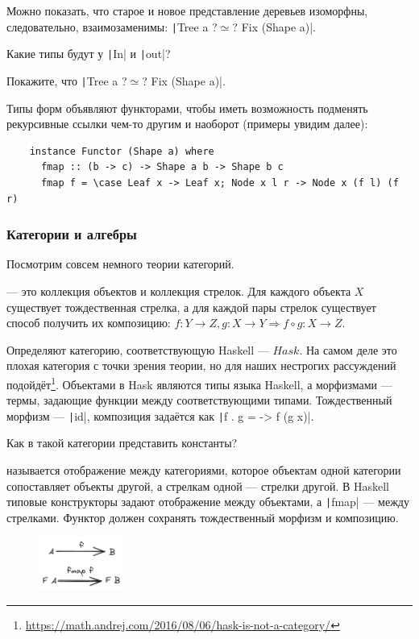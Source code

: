 Можно показать, что старое и новое представление деревьев изоморфны, следовательно, взаимозаменимы: \texttt|Tree a ?$\simeq$? Fix (Shape a)|.

\begin{task}
    Какие типы будут у \texttt|In| и \texttt|out|?
\end{task}

\begin{task}
    Покажите, что \texttt|Tree a ?$\simeq$? Fix (Shape a)|.
\end{task}

Типы форм объявляют функторами, чтобы иметь возможность подменять рекурсивные ссылки чем-то другим и наоборот (примеры увидим далее):
\begin{verbatim}
    instance Functor (Shape a) where
      fmap :: (b -> c) -> Shape a b -> Shape b c
      fmap f = \case Leaf x -> Leaf x; Node x l r -> Node x (f l) (f r)
\end{verbatim}

\subsubsection{Категории и алгебры}

Посмотрим совсем немного теории категорий.

 --- это коллекция объектов и коллекция стрелок.
Для каждого объекта $X$ существует тождественная стрелка, а для каждой пары стрелок существует способ получить их композицию: $f : Y \to Z, g : X \to Y \Rightarrow f \circ g : X \to Z$.

Определяют категорию, соответствующую Haskell --- $Hask$.
На самом деле это плохая категория с точки зрения теории, но для наших нестрогих рассуждений подойдёт\footnote{\url{https://math.andrej.com/2016/08/06/hask-is-not-a-category/}}.
Объектами в Hask являются типы языка Haskell, а морфизмами --- термы, задающие функции между соответствующими типами.
Тождественный морфизм --- \texttt|id|, композиция задаётся как \texttt|f . g = \x -> f (g x)|.

\begin{task}
    Как в такой категории представить константы?
\end{task}

 называется отображение между категориями, которое объектам одной категории сопоставляет объекты другой, а стрелкам одной --- стрелки другой.
В Haskell типовые конструкторы задают отображение между объектами, а \texttt|fmap| --- между стрелками.
Функтор должен сохранять тождественный морфизм и композицию.
\begin{figure}[h!]
    \centering
    \includegraphics[width=0.25\textwidth]{figs/functor}
\end{figure}

